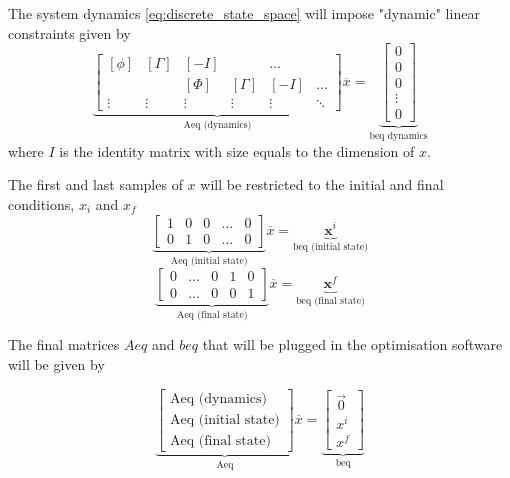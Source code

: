 \par The system dynamics \ref{eq:discrete_state_space} will impose "dynamic" linear constraints given by
\begin{equation}
    \label{eq:quad_prog_Aeq_dyn}
    \underbrace{\begin{bmatrix}
        [\phi] & \left[\Gamma\right] & \left[ -I \right] & & \ldots \\
        & & [\Phi] & [\Gamma] & \left[ -I \right] & \ldots \\
        \vdots & \vdots & \vdots & \vdots & \vdots & \ddots 
    \end{bmatrix}}_\text{Aeq (dynamics)}
    \overline{x} = \underbrace{\begin{bmatrix} 0 \\ 0 \\ 0 \\ \vdots \\ 0 \end{bmatrix}}_\text{beq dynamics}
\end{equation}
where $I$ is the identity matrix with size equals to the dimension of $x$.

\par The first and last samples of $x$ will be restricted to the initial and final conditions, $x_i$ and $x_f$
\begin{equation}
    \label{eq:quad_prog_Aeq_init}
    \underbrace{\begin{bmatrix} 
        1 & 0 & 0 & \ldots & 0 \\
        0 & 1 & 0 & \ldots & 0 
    \end{bmatrix}}_\text{Aeq (initial state)}
    \overline{x} = \underbrace{\mathbf{x}^i}_\text{beq (initial state)}
\end{equation}
\begin{equation}
    \label{eq:quad_prog_Aeq_final}
    \underbrace{\begin{bmatrix} 
        0 & \ldots & 0 & 1 & 0 \\
        0 & \ldots & 0 & 0 & 1 
    \end{bmatrix}}_\text{Aeq (final state)}
    \overline{x} = \underbrace{\mathbf{x}^f}_\text{beq (final state)}
\end{equation}

\par The final matrices $Aeq$ and $beq$ that will be plugged in the optimisation software will be given by

\begin{equation}
    \label{eq:quad_prog_Aeq_total}
    \underbrace{\begin{bmatrix}
        \text{Aeq (dynamics)} \\ \text{Aeq (initial state)} \\ \text{Aeq (final state)}
        \end{bmatrix}}_\text{Aeq}
    \overline{x} =
    \underbrace{\begin{bmatrix}
        \vec{0} \\ x^i \\ x^f
        \end{bmatrix}}_\text{beq}
\end{equation}


